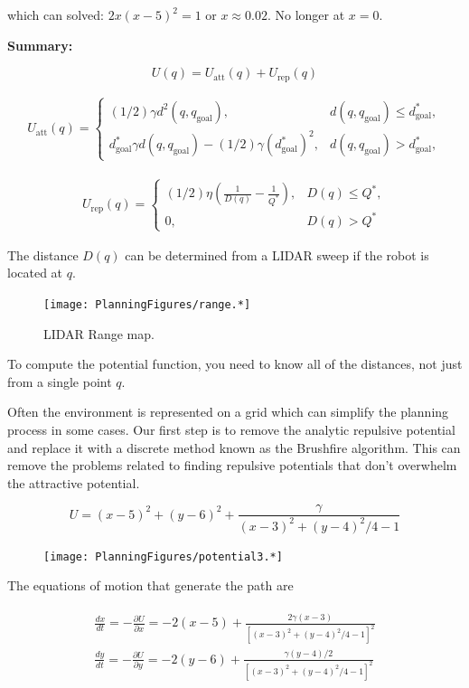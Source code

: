 which can solved: \(2x(x-5)^2 = 1\) or \(x\approx 0.02\). No longer at
\(x=0\).

\textbf{Summary:}

\[U(q) = U_\text{att}(q) + U_\text{rep}(q)\]

\[\begin{aligned}
U_\text{att}(q) = \left\{ \begin{array}{ll} (1/2)\gamma d^2(q, q_\text{goal}), & d(q, q_\text{goal})\leq d^*_\text{goal},\\[3mm]
d^*_\text{goal}\gamma d(q, q_\text{goal}) - (1/2)\gamma (d^*_\text{goal})^2, & d(q, q_\text{goal})> d^*_\text{goal},
\end{array}\right.
\end{aligned}\]

\[\begin{aligned}
U_\text{rep}(q) = \left\{ \begin{array}{ll} (1/2)\eta \left( \frac{1}{D(q)} - \frac{1}{Q^*}\right) , &
D(q) \leq Q^*,\\[3mm]
0, & D(q) > Q^*
\end{array}\right.
\end{aligned}\]

The distance \(D(q)\) can be determined from a LIDAR sweep if the robot
is located at \(q\).

\begin{figure}
\centering
\texttt{[image: PlanningFigures/range.*]}
\caption{LIDAR Range map.}
\end{figure}

To compute the potential function, you need to know all of the
distances, not just from a single point \(q\).

Often the environment is represented on a grid which can simplify the
planning process in some cases. Our first step is to remove the analytic
repulsive potential and replace it with a discrete method known as the
Brushfire algorithm. This can remove the problems related to finding
repulsive potentials that don't overwhelm the attractive potential.

\[U = (x-5)^2 +(y-6)^2 +  \frac{\gamma}{ (x-3)^2 + (y-4)^2/4 - 1}\]

\begin{figure}
\centering
\texttt{[image: PlanningFigures/potential3.*]}
\caption{}
\end{figure}

The equations of motion that generate the path are

\[\begin{aligned}
\begin{array}{l}
\displaystyle \frac{dx}{dt} = -\frac{\partial U}{\partial x} = -2(x-5) + \frac{2\gamma(x-3)}{[(x-3)^2 + (y-4)^2/4 - 1]^{2}}\\[10pt]
\displaystyle \frac{dy}{dt} = -\frac{\partial U}{\partial y} = -2(y-6) + \frac{\gamma(y-4)/2}{[(x-3)^2 + (y-4)^2/4 - 1]^{2}}
\end{array}
\end{aligned}\]


